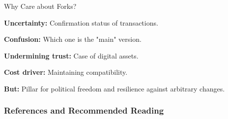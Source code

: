\documentclass[handout]{beamer}
\begin{document}
\begin{frame}{Why Care about Forks?}

\textbf{Uncertainty:} Confirmation status of transactions.
\vspace{1.5em}

\textbf{Confusion:} Which one is the "main" version.
\vspace{1.5em}

\textbf{Undermining trust:} Case of digital assets.
\vspace{1.5em}

\textbf{Cost driver:} Maintaining compatibility.
\vspace{1.5em}

\color{focus} \textbf{But:} \color{black} Pillar for political freedom and resilience against arbitrary changes.

	
\end{frame}

\begin{frame}%
\frametitle{References and Recommended Reading}

	
	

\end{frame}
\end{document}
